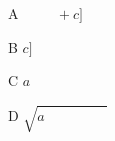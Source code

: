 \documentclass{article}
\begin{document}
A $\phantom{{}={}}\quad{}+c\biggr]$

B $c\biggr]\quad\phantom{x}$

C $a\quad\phantom{x}$

D $\sqrt{a\phantom{x+(y)^2}}$
\end{document}
